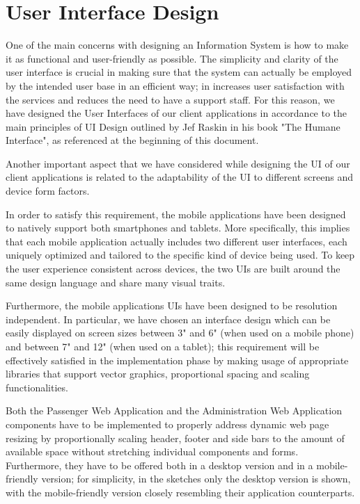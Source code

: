 \chapter{User Interface Design}
One of the main concerns with designing an Information System is how to make it as functional and user-friendly as possible. The simplicity and clarity of the user interface is crucial in making sure that the system can actually be employed by the intended user base in an efficient way; in increases user satisfaction with the services and reduces the need to have a support staff. 
For this reason, we have designed the User Interfaces of our client applications in accordance to the main principles of UI Design outlined by Jef Raskin in his book "The Humane Interface", as referenced at the beginning of this document. 

Another important aspect that we have considered while designing the UI of our client applications is related to the adaptability of the UI to different screens and device form factors. 

In order to satisfy this requirement, the mobile applications have been designed to natively support both smartphones and tablets. More specifically, this implies that each mobile application actually includes two different user interfaces, each uniquely optimized and tailored to the specific kind of device being used. To keep the user experience consistent across devices, the two UIs are built around the same design language and share many visual traits. 

Furthermore, the mobile applications UIs have been designed to be resolution independent. In particular, we have chosen an interface design which can be easily displayed on screen sizes between 3" and 6" (when used on a mobile phone) and between 7" and 12" (when used on a tablet); this requirement will be effectively satisfied in the implementation phase by making usage of appropriate libraries that support vector graphics, proportional spacing and scaling functionalities.

Both the Passenger Web Application and the Administration Web Application components have to be implemented to properly address dynamic web page resizing by proportionally scaling header, footer and side bars to the amount of available space without stretching individual components and forms. Furthermore, they have to be offered both in a desktop version and in a mobile-friendly version; for simplicity, in the sketches only the desktop version is shown, with the mobile-friendly version closely resembling their application counterparts. 

